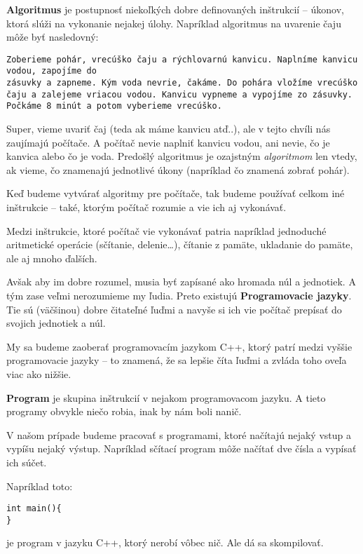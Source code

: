 \textbf{Algoritmus} je postupnosť niekoľkých dobre definovaných inštrukcií --
úkonov, ktorá slúži na vykonanie nejakej úlohy.  Napríklad algoritmus na
uvarenie čaju môže byť nasledovný:

\texttt{Zoberieme pohár, vrecúško čaju a rýchlovarnú kanvicu. Naplníme kanvicu
vodou, zapojíme do\\ zásuvky a zapneme. Kým voda nevrie, čakáme.  Do pohára
vložíme vrecúško čaju a zalejeme vriacou vodou. Kanvicu vypneme a vypojíme zo
zásuvky. Počkáme 8 minút a potom vyberieme vrecúško.}

Super, vieme uvariť čaj (teda ak máme kanvicu atď..), ale v tejto chvíli nás
zaujímajú počítače. A počítač nevie naplniť kanvicu vodou, ani nevie, čo je
kanvica alebo čo je voda. Predošlý algoritmus je ozajstným \emph{algoritmom}
len vtedy, ak vieme, čo znamenajú jednotlivé úkony (napríklad čo znamená zobrať
pohár). 

\medskip

Keď budeme vytvárať algoritmy pre počítače, tak budeme používať celkom iné
inštrukcie -- také, ktorým počítač rozumie a vie ich aj vykonávať.

Medzi inštrukcie, ktoré počítač vie vykonávať patria napríklad jednoduché
aritmetické operácie (sčítanie, delenie\dots), čítanie z pamäte, ukladanie do
pamäte, ale aj mnoho ďalších. 

Avšak aby im dobre rozumel, musia byť zapísané ako hromada núl a jednotiek. A
tým zase veľmi nerozumieme my ľudia.  Preto existujú \textbf{Programovacie
jazyky}. Tie sú (väčšinou) dobre čitateľné ľuďmi a navyše si ich vie počítač
prepísať do svojich jednotiek a núl.

My sa budeme zaoberať programovacím jazykom C++, ktorý patrí medzi vyššie
programovacie jazyky -- to znamená, že sa lepšie číta ľuďmi a zvláda toho
oveľa viac ako nižšie.

\medskip

\textbf{Program} je skupina inštrukcií v nejakom programovacom jazyku.  A tieto
programy obvykle niečo robia, inak by nám boli nanič. 

V našom prípade budeme pracovať s programami, ktoré načítajú nejaký vstup a
vypíšu nejaký výstup.  Napríklad sčítací program môže načítať dve čísla a
vypísať ich súčet.

Napríklad toto:
\begin{lstlisting}
int main(){
}
\end{lstlisting}
je program v jazyku C++, ktorý nerobí vôbec nič. Ale dá sa skompilovať. 

